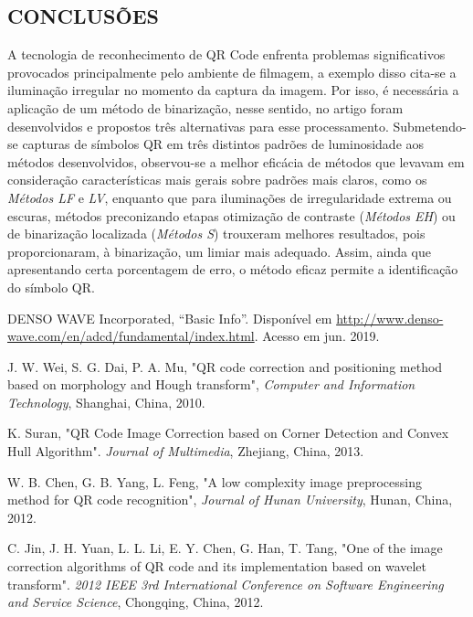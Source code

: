 \documentclass{ceel}
\begin{document}
\begin{multicols}{2}
\section{CONCLUSÕES}
A tecnologia de reconhecimento de QR Code enfrenta problemas significativos provocados principalmente pelo ambiente de filmagem, a exemplo disso cita-se a iluminação irregular no momento da captura da imagem. Por isso, é necessária a aplicação de um método de binarização, nesse sentido, no artigo foram desenvolvidos e propostos três alternativas para esse processamento. Submetendo-se capturas de símbolos QR em três distintos padrões de luminosidade aos métodos desenvolvidos, observou-se a melhor eficácia de métodos que levavam em consideração características mais gerais sobre padrões mais claros, como os \emph{Métodos LF} e \textit{LV}, enquanto que para iluminações de irregularidade extrema ou escuras, métodos preconizando etapas otimização de contraste (\emph{Métodos EH}) ou de binarização localizada (\emph{Métodos S}) trouxeram melhores resultados, pois proporcionaram, à binarização, um limiar mais adequado. Assim, ainda que apresentando certa porcentagem de erro, o método eficaz permite a identificação do símbolo QR.

\begin{thebibliography}{9} %

    DENSO WAVE Incorporated,
    “Basic Info”. 
    Disponível em \url{http://www.denso-wave.com/en/adcd/fundamental/index.html}. Acesso em jun. 2019.

J. W. Wei, S. G. Dai, P. A. Mu, 
"QR code correction and positioning method based on morphology and Hough transform", 
\emph{Computer and Information
Technology}, Shanghai, China, 2010.

K. Suran, 
"QR Code Image Correction based on Corner Detection and Convex Hull Algorithm". 
\emph{Journal of Multimedia}, Zhejiang, China, 2013.

 W. B. Chen, G. B. Yang, L. Feng, 
"A low complexity image preprocessing method for QR code recognition", 
\emph{Journal of Hunan University}, Hunan, China, 2012.

C. Jin, J. H. Yuan, L. L. Li, E. Y. Chen, G. Han, T. Tang, 
"One of the image correction algorithms of QR code and its implementation
based on wavelet transform".
\emph{2012 IEEE 3rd International Conference on
Software Engineering and Service Science}, Chongqing, China, 2012.


\end{thebibliography}
\end{multicols}
\end{document}

